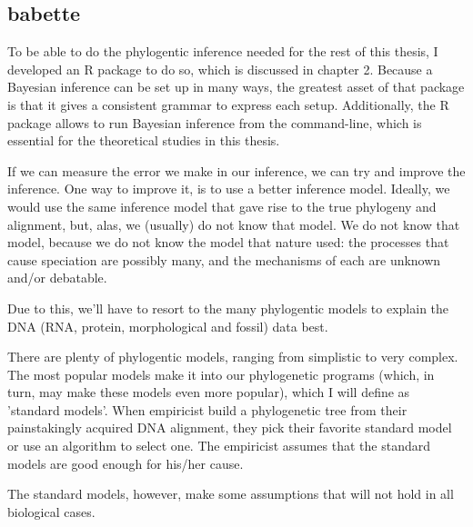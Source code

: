 \subsection{babette}

To be able to do the phylogentic inference needed for the rest of this
thesis, I developed an R package to do so, which
is discussed in chapter 2. Because a Bayesian inference can be set up in
many ways, the greatest asset of that package is that it gives a
consistent grammar to express each setup. Additionally, the R package allows
to run Bayesian inference from the command-line, which is essential for
the theoretical studies in this thesis.

If we can measure the error we make in our inference, 
we can try and improve the inference. 
One way to improve it, is to use a better inference model.
Ideally, we would use the same inference model that gave rise to
the true phylogeny and alignment, but, alas, 
we (usually) do not know that model.
We do not know that model, because we do not know the
model that nature used: the
processes that cause speciation are possibly many, and 
the mechanisms of each are unknown and/or debatable.


Due to this, we'll have to resort to the many phylogentic models 
to explain the DNA (RNA, protein, morphological and fossil) data best.

There are plenty of phylogentic models, ranging from simplistic to
very complex. The most popular models make it into our
phylogenetic programs (which, in turn, may make these models even
more popular), which I will define as 'standard models'.
When empiricist build a phylogenetic tree from their
painstakingly acquired DNA alignment, they pick their favorite standard
model or use an algorithm to select one. The empiricist assumes that the
standard models are good enough for his/her cause.

The standard models, however, make some assumptions that will not hold
in all biological cases.


